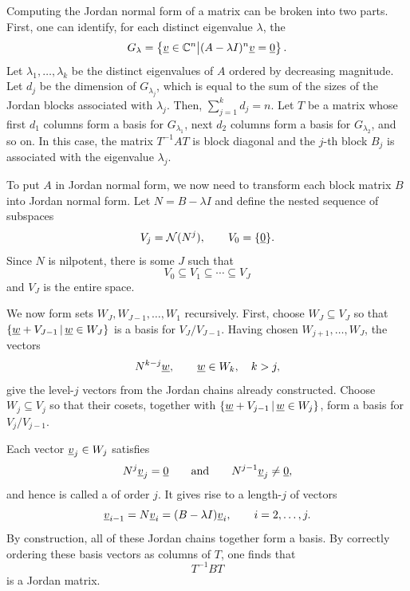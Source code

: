 Computing the Jordan normal form of a matrix can be broken into two parts.
First, one can identify, for each distinct eigenvalue $\lambda$, the 
\[ G_\lambda = \left\{ \underline{v} \in \mathbb{C}^n \big| (A-\lambda I)^n \underline{v} = \underline{0} \right\}. \]
Let $\lambda_1 , \ldots , \lambda_k$ be the distinct eigenvalues of $A$ ordered by decreasing magnitude.
Let $d_j$ be the dimension of $G_{\lambda_j}$, which is equal to the sum of the sizes of the Jordan blocks associated with $\lambda_j$.
Then, $\sum_{j=1}^k d_j = n$.
Let $T$ be a matrix whose first $d_1$ columns form a basis for $G_{\lambda_1}$, next $d_2$ columns form a basis for $G_{\lambda_2}$, and so on.
In this case, the matrix $T^{-1} A T$ is block diagonal and the $j$-th block $B_j$ is associated with the eigenvalue $\lambda_j$.


To put $A$ in Jordan normal form, we now need to transform each block matrix $B$ into Jordan normal form.
Let $N = B-\lambda I$ and define the nested sequence of subspaces
\[
V_j = \mathcal{N}(N^j),
\qquad
V_0=\{\underline{0}\}.
\]
Since $N$ is nilpotent, there is some $J$ such that
\[
V_0 \subseteq V_1 \subseteq \cdots \subseteq V_J
\]
and $V_J$ is the entire space.

We now form sets $W_J,W_{J-1},\ldots,W_1$ recursively.
First, choose $W_J \subseteq V_J$ so that
$\left\{
\underline{w}+V_{J-1}
\,\middle|\,
\underline{w}\in W_J
\right\}$
is a basis for $V_J/V_{J-1}$.
Having chosen $W_{j+1},\ldots,W_J$, the vectors
\[
N^{k-j}\underline{w},
\qquad
\underline{w}\in W_k,\quad k>j,
\]
give the level-$j$ vectors from the Jordan chains already constructed.
Choose $W_j\subseteq V_j$ so that their cosets, together with
$ \left\{
\underline{w}+V_{j-1}
\,\middle|\,
\underline{w}\in W_j
\right\}$,
form a basis for $V_j/V_{j-1}$.

Each vector $\underline{v}_j\in W_j$ satisfies
\[
N^j\underline{v}_j=\underline{0}
\qquad\text{and}\qquad
N^{j-1}\underline{v}_j\neq\underline{0},
\]
and hence is called a  of order $j$.
It gives rise to a length-$j$  of vectors
\[
\underline{v}_{i-1}
=
N\underline{v}_i
=
(B-\lambda I)\underline{v}_i,
\qquad
i=2,\ldots,j.
\]
By construction, all of these Jordan chains together form a basis.
By correctly ordering these basis vectors as columns of $T$, one finds that
\[
T^{-1}BT
\]
is a Jordan matrix.

